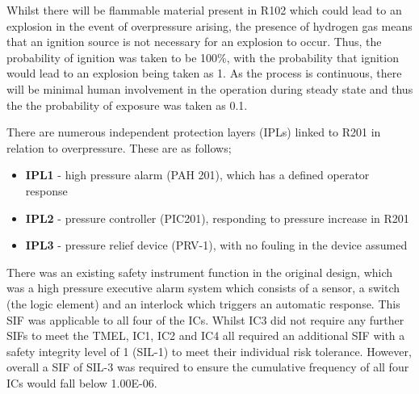 Whilst there will be flammable material present in R102 which could lead to an explosion in the event of overpressure arising, the presence of hydrogen gas means that an ignition source is not necessary for an explosion to occur. Thus, the probability of ignition was taken to be 100\%, with the probability that ignition would lead to an explosion being taken as 1. As the process is continuous, there will be minimal human involvement in the operation during steady state and thus the the probability of exposure was taken as 0.1. 

There are numerous  independent protection layers (IPLs) linked to R201 in relation to overpressure. These are as follows;
 
 \begin{itemize}
\item \textbf{IPL1} - high pressure alarm (PAH 201), which has a defined operator response
\item  \textbf{IPL2} - pressure controller (PIC201), responding to pressure increase in R201
\item  \textbf{IPL3} - pressure relief device (PRV-1), with no fouling in the device assumed
 \end{itemize}


There was an existing safety instrument function in the original design, which was a high pressure executive alarm system which consists of a sensor, a switch (the logic element) and an interlock which triggers an automatic response. This SIF was applicable to all four of the ICs. Whilst IC3 did not require any further SIFs to meet the TMEL, IC1, IC2 and IC4 all required an additional SIF with a safety integrity level of 1 (SIL-1) to meet their individual risk tolerance. However, overall a SIF of SIL-3 was required to ensure the cumulative frequency of all four ICs would fall below 1.00E-06. 












 
